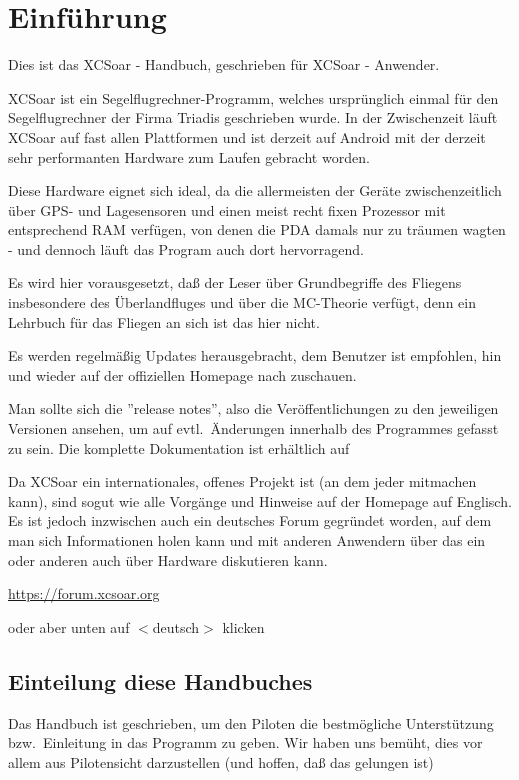 \chapter{Einführung}\label{cha:introduction}
Dies ist das \textsf{XCSoar} - Handbuch, geschrieben für \textsf{XCSoar} - Anwender. 

 

\textsf{XCSoar} ist ein Segelflugrechner-Programm, welches ursprünglich einmal für den Segelflugrechner \al der Firma Triadis geschrieben wurde.  
In der Zwischenzeit läuft \textsf{XCSoar} auf fast allen Plattformen und ist derzeit auf Android mit der derzeit 
sehr performanten Hardware zum Laufen gebracht worden. 

Diese Hardware eignet sich ideal, da die allermeisten der Geräte zwischenzeitlich über GPS- und Lagesensoren und einen 
meist recht fixen Prozessor mit entsprechend RAM verfügen, von denen die PDA damals nur zu träumen wagten - und dennoch 
läuft das Program auch dort hervorragend. 


Es wird hier vorausgesetzt, daß der Leser über Grundbegriffe des Fliegens insbesondere des Überlandfluges 
und über die MC-Theorie verfügt, denn ein Lehrbuch für das Fliegen an sich ist das hier nicht.


Es werden regelmäßig Updates herausgebracht, dem Benutzer ist empfohlen, hin und wieder auf der offiziellen Homepage nach zuschauen. 

Man sollte sich die ''release notes'', also die Veröffentlichungen zu den jeweiligen Versionen ansehen, um  auf evtl.\ Änderungen innerhalb des Programmes gefasst zu sein. 
Die komplette Dokumentation ist erhältlich auf  
\begin{center}
\xcsoarwebsite{}
\end{center}
Da \textsf{XCSoar} ein internationales, offenes Projekt ist (an dem jeder mitmachen kann), sind sogut wie alle Vorgänge und Hinweise auf der Homepage auf Englisch. 
Es ist jedoch inzwischen auch ein deutsches Forum gegründet worden, auf dem man sich Informationen holen kann und mit anderen Anwendern über das ein oder anderen auch über Hardware diskutieren kann.
\begin{center}
\url{https://forum.xcsoar.org}
\end{center}
oder aber unten auf $<$deutsch$>$ klicken

\section{Einteilung diese Handbuches}
Das Handbuch ist geschrieben, um den Piloten die bestmögliche Unterstützung bzw.\ Einleitung in das Programm zu geben. 
Wir haben uns bemüht, dies vor allem aus Pilotensicht darzustellen (und hoffen, daß das gelungen ist) 

